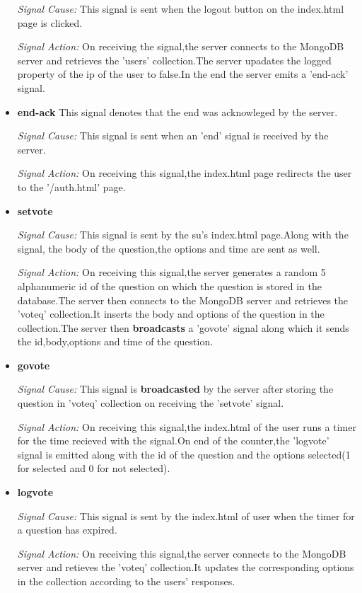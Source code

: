 \documentclass[a4paper,10pt]{article}
\begin{document}
\begin{itemize}
\textit{Signal Cause:}
    This signal is sent when the logout button on the index.html page is clicked.

\textit{Signal Action:}
    On receiving the signal,the server connects to the MongoDB server and retrieves
the 'users' collection.The server upadates the logged property of the ip of the user
to false.In the end the server emits a 'end-ack' signal.

\item \textbf{end-ack}
This signal denotes that the end was acknowleged by the server.

\textit{Signal Cause:}
    This signal is sent when an 'end' signal is received by the server.

\textit{Signal Action:}
    On receiving this signal,the index.html page redirects the user to the
'/auth.html' page.

\item \textbf{setvote}

\textit{Signal Cause:}
    This signal is sent by the su's index.html page.Along with the signal,
the body of the question,the options and time are sent as well.

\textit{Signal Action:}
    On receiving this signal,the server generates a random 5 alphanumeric id 
of the question on which the question is stored in the database.The server then
connects to the MongoDB server and retrieves the 'voteq' collection.It inserts the 
body and options of the question in the collection.The server then \textbf{broadcasts} a 
'govote' signal along which it sends the id,body,options and time of the question.


\item \textbf{govote}

\textit{Signal Cause:}
    This signal is \textbf{broadcasted} by the server after storing the question in 'voteq'
collection on receiving the 'setvote' signal.

\textit{Signal Action:}
    On receiving this signal,the index.html of the user runs a timer for the time recieved
with the signal.On end of the counter,the 'logvote' signal is emitted along with the id of
the question and the options selected(1 for selected and 0 for not selected).


\item \textbf{logvote}

\textit{Signal Cause:}
    This signal is sent by the index.html of user when the timer for a question has expired.

\textit{Signal Action:}
    On receiving this signal,the server connects to the MongoDB server and retieves the 'voteq'
collection.It updates the corresponding options in the collection according to the users' 
responses.


\end{itemize}
\end{document}
